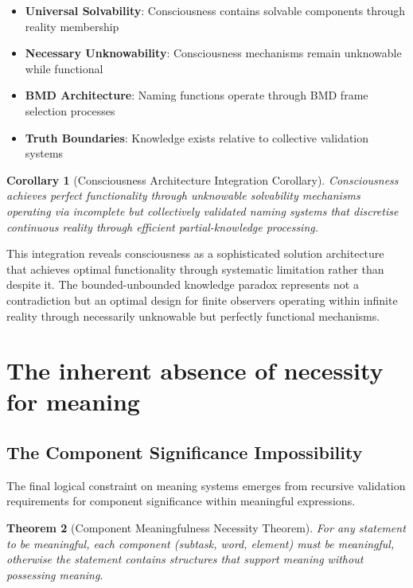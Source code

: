 \documentclass[12pt,a4paper]{article}
\newtheorem{theorem}{Theorem}[section]
\newtheorem{corollary}[theorem]{Corollary}
\begin{document}
\begin{itemize}
\item \textbf{Universal Solvability}: Consciousness contains solvable components through reality membership
\item \textbf{Necessary Unknowability}: Consciousness mechanisms remain unknowable while functional
\item \textbf{BMD Architecture}: Naming functions operate through BMD frame selection processes
\item \textbf{Truth Boundaries}: Knowledge exists relative to collective validation systems
\end{itemize}

\begin{corollary}[Consciousness Architecture Integration Corollary]
Consciousness achieves perfect functionality through unknowable solvability mechanisms operating via incomplete but collectively validated naming systems that discretise continuous reality through efficient partial-knowledge processing.
\end{corollary}

This integration reveals consciousness as a sophisticated solution architecture that achieves optimal functionality through systematic limitation rather than despite it. The bounded-unbounded knowledge paradox represents not a contradiction but an optimal design for finite observers operating within infinite reality through necessarily unknowable but perfectly functional mechanisms.

\section{The inherent absence of necessity for meaning}

\subsection{The Component Significance Impossibility}

The final logical constraint on meaning systems emerges from recursive validation requirements for component significance within meaningful expressions.

\begin{theorem}[Component Meaningfulness Necessity Theorem]
For any statement to be meaningful, each component (subtask, word, element) must be meaningful, otherwise the statement contains structures that support meaning without possessing meaning.
\end{theorem}
\end{document}
